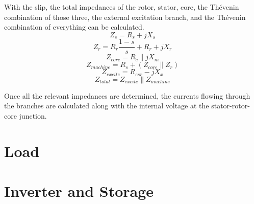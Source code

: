 With the slip, the total impedances of the rotor, stator, core, the Th\'evenin combination of those three, the external excitation branch, and the Th\'evenin combination of everything can be calculated.
\begin{equation*}
Z_s = R_s + jX_s
\end{equation*}
\begin{equation*}
Z_r = R_r\frac{1-s}{s} + R_r + jX_r
\end{equation*}
\begin{equation*}
Z_{core} = R_c \parallel jX_m
\end{equation*}
\begin{equation*}
Z_{machine} = R_s + \left(Z_{core} \parallel Z_r\right)
\end{equation*}
\begin{equation*}
Z_{excite} = R_{esr} - jX_x
\end{equation*}
\begin{equation*}
Z_{total} = Z_{excite} \parallel Z_{machine}
\end{equation*}

Once all the relevant impedances are determined, the currents flowing through the branches are calculated along with the internal voltage at the stator-rotor-core junction.
\section{Load}

\section{Inverter and Storage}